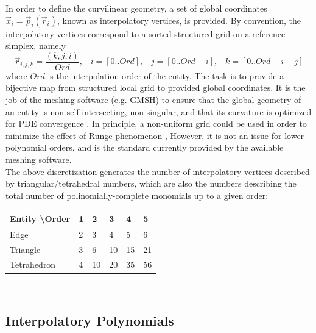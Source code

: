 \noindent
In order to define the curvilinear geometry, a set of global coordinates $\vec{x}_i = \vec{p}_i(\vec{r}_i)$, known as interpolatory vertices, is provided. By convention, the interpolatory vertices correspond to a sorted structured grid on a reference simplex, namely
\[\vec{r}_{i,j,k} = \frac{(k,j,i)}{Ord}, \;\;\; i=[0..Ord], \;\;\; j=[0..Ord-i], \;\;\; k=[0..Ord-i-j]\]
where $Ord$ is the interpolation order of the entity. The task is to provide a bijective map from structured local grid to provided global coordinates. It is the job of the meshing software (e.g. GMSH\citeGMSH{}) to ensure that the global geometry of an entity is non-self-intersecting, non-singular, and that its curvature is optimized for PDE convergence \cite{lenoir1986}. In principle, a non-uniform grid could be used in order to minimize the effect of Runge phenomenon \cite{runge1901}, However, it is not an issue for lower polynomial orders, and is the standard currently provided by the available meshing software. \\

\noindent
The above discretization generates the number of interpolatory vertices described by triangular/tetrahedral numbers, which are also the numbers describing the total number of polinomially-complete monomials up to a given order: \\

\noindent
\begin{tabular}{l l l l l l}
\hline
  Entity \textbackslash Order & 1 & 2  & 3  & 4  & 5 \\ \hline
  Edge                        & 2 & 3  & 4  & 5  & 6 \\
  Triangle                    & 3 & 6  & 10 & 15 & 21 \\
  Tetrahedron                 & 4 & 10 & 20 & 35 & 56 \\
\end{tabular} \\


\subsection{Interpolatory Polynomials}
\label{theory-lagrange-polynomials}

